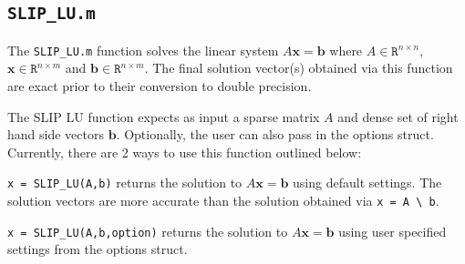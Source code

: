 \documentclass[12pt]{article}
\theoremstyle{definition}
\begin{document}
\cprotect\subsection{\verb|SLIP_LU.m|} \label{s:Use:MATLAB:factor}

The \verb|SLIP_LU.m| function solves the linear system $A \mathbf{x} = \mathbf{b}$ where $A \in \mathtt{R}^{n \times n}$, $\mathbf{x} \in \mathtt{R}^{n \times m}$ and $\mathbf{b} \in \mathtt{R}^{n \times m}$. The final solution vector(s) obtained via this function are exact prior to their conversion to double precision.

The SLIP LU function expects as input a sparse matrix $A$ and dense set of right hand side vectors $\mathbf{b}$. Optionally, the user can also pass in the options struct. Currently, there are 2 ways to use this function outlined below:

\verb|x = SLIP_LU(A,b)| returns the solution to $A \mathbf{x} = \mathbf{b}$ using default settings. The solution vectors are more accurate than the solution obtained via \verb|x = A \ b|.

\verb|x = SLIP_LU(A,b,option)| returns the solution to $A \mathbf{x} = \mathbf{b}$ using user specified settings from the options struct.

\newpage



\end{document}
